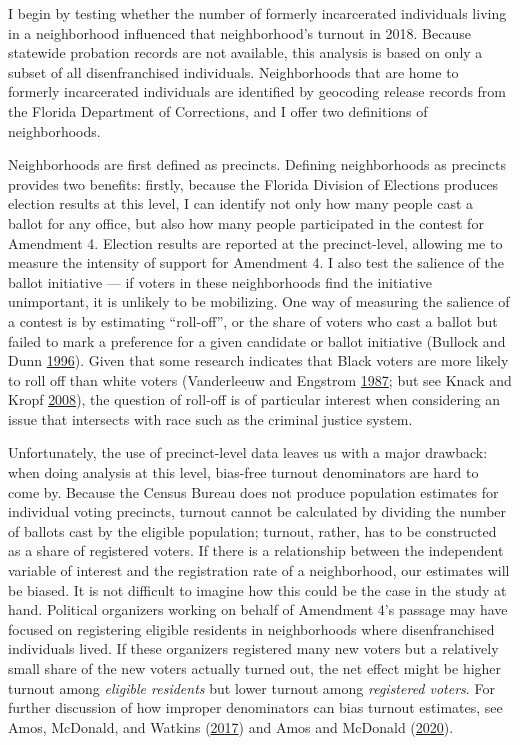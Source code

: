\documentclass[
  12pt,
]{article}
\begin{document}
I begin by testing whether the number of formerly incarcerated individuals living in a neighborhood influenced that neighborhood's turnout in 2018. Because statewide probation records are not available, this analysis is based on only a subset of all disenfranchised individuals. Neighborhoods that are home to formerly incarcerated individuals are identified by geocoding release records from the Florida Department of Corrections, and I offer two definitions of neighborhoods.

Neighborhoods are first defined as precincts. Defining neighborhoods as precincts provides two benefits: firstly, because the Florida Division of Elections produces election results at this level, I can identify not only how many people cast a ballot for any office, but also how many people participated in the contest for Amendment 4. Election results are reported at the precinct-level, allowing me to measure the intensity of support for Amendment 4. I also test the salience of the ballot initiative --- if voters in these neighborhoods find the initiative unimportant, it is unlikely to be mobilizing. One way of measuring the salience of a contest is by estimating ``roll-off'', or the share of voters who cast a ballot but failed to mark a preference for a given candidate or ballot initiative (Bullock and Dunn \protect\hyperlink{ref-Bullock1996}{1996}). Given that some research indicates that Black voters are more likely to roll off than white voters (Vanderleeuw and Engstrom \protect\hyperlink{ref-Vanderleeuw1987}{1987}; but see Knack and Kropf \protect\hyperlink{ref-Knack2008}{2008}), the question of roll-off is of particular interest when considering an issue that intersects with race such as the criminal justice system.

Unfortunately, the use of precinct-level data leaves us with a major drawback: when doing analysis at this level, bias-free turnout denominators are hard to come by. Because the Census Bureau does not produce population estimates for individual voting precincts, turnout cannot be calculated by dividing the number of ballots cast by the eligible population; turnout, rather, has to be constructed as a share of registered voters. If there is a relationship between the independent variable of interest and the registration rate of a neighborhood, our estimates will be biased. It is not difficult to imagine how this could be the case in the study at hand. Political organizers working on behalf of Amendment 4's passage may have focused on registering eligible residents in neighborhoods where disenfranchised individuals lived. If these organizers registered many new voters but a relatively small share of the new voters actually turned out, the net effect might be higher turnout among \emph{eligible residents} but lower turnout among \emph{registered voters}. For further discussion of how improper denominators can bias turnout estimates, see Amos, McDonald, and Watkins (\protect\hyperlink{ref-Amos2017}{2017}) and Amos and McDonald (\protect\hyperlink{ref-Amos2020}{2020}).
\end{document}
